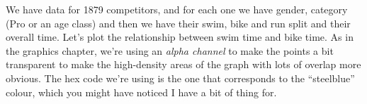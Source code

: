 \documentclass[
]{book}
\newenvironment{Shaded}{\begin{snugshade}}{\end{snugshade}}
\newcommand{\DataTypeTok}[1]{\textcolor[rgb]{0.13,0.29,0.53}{#1}}
\newcommand{\DecValTok}[1]{\textcolor[rgb]{0.00,0.00,0.81}{#1}}
\newcommand{\ErrorTok}[1]{\textcolor[rgb]{0.64,0.00,0.00}{\textbf{#1}}}
\newcommand{\FloatTok}[1]{\textcolor[rgb]{0.00,0.00,0.81}{#1}}
\newcommand{\KeywordTok}[1]{\textcolor[rgb]{0.13,0.29,0.53}{\textbf{#1}}}
\newcommand{\NormalTok}[1]{#1}
\newcommand{\OperatorTok}[1]{\textcolor[rgb]{0.81,0.36,0.00}{\textbf{#1}}}
\newcommand{\OtherTok}[1]{\textcolor[rgb]{0.56,0.35,0.01}{#1}}
\newcommand{\StringTok}[1]{\textcolor[rgb]{0.31,0.60,0.02}{#1}}
\begin{document}
\begin{Shaded}
\end{Shaded}

We have data for 1879 competitors, and for each one we have gender, category (Pro or an age class) and then we have their swim, bike and run split and their overall time. Let's plot the relationship between swim time and bike time. As in the graphics chapter, we're using an \emph{alpha channel} to make the points a bit transparent to make the high-density areas of the graph with lots of overlap more obvious. The hex code we're using is the one that corresponds to the ``steelblue'' colour, which you might have noticed I have a bit of thing for.
\end{document}
